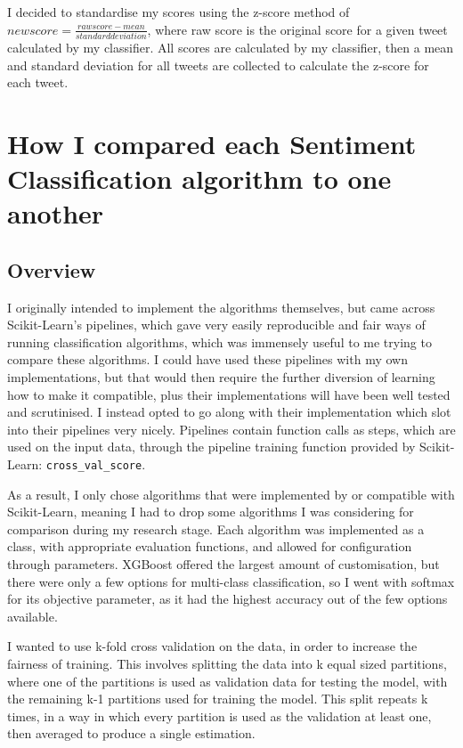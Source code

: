 \documentclass{article}
\begin{document}
I decided to standardise my scores using the z-score method of $new score = \frac{raw score - mean}{standard deviation}$, where raw score is the original score for a given tweet calculated by my classifier.
All scores are calculated by my classifier, then a mean and standard deviation for all tweets are collected to calculate the z-score for each tweet\autocite[15]{cross_validation}.

\newpage
\section{How I compared each Sentiment Classification algorithm to one another}

\subsection{Overview}

I originally intended to implement the algorithms themselves, but came across Scikit-Learn's pipelines, which gave very easily reproducible and fair ways of running classification algorithms, which was immensely useful to me trying to compare these algorithms.
I could have used these pipelines with my own implementations, but that would then require the further diversion of learning how to make it compatible, plus their implementations will have been well tested and scrutinised.
I instead opted to go along with their implementation which slot into their pipelines very nicely.
Pipelines contain function calls as steps, which are used on the input data, through the pipeline training function provided by Scikit-Learn: \lstinline{cross_val_score}.

As a result, I only chose algorithms that were implemented by or compatible with Scikit-Learn, meaning I had to drop some algorithms I was considering for comparison during my research stage.
Each algorithm was implemented as a class, with appropriate evaluation functions, and allowed for configuration through parameters.
XGBoost offered the largest amount of customisation, but there were only a few options for multi-class classification, so I went with softmax for its objective parameter, as it had the highest accuracy out of the few options available.

I wanted to use k-fold cross validation on the data, in order to increase the fairness of training.
This involves splitting the data into k equal sized partitions, where one of the partitions is used as validation data for testing the model, with the remaining k-1 partitions used for training the model.
This split repeats k times, in a way in which every partition is used as the validation at least one, then averaged to produce a single estimation.
\end{document}

